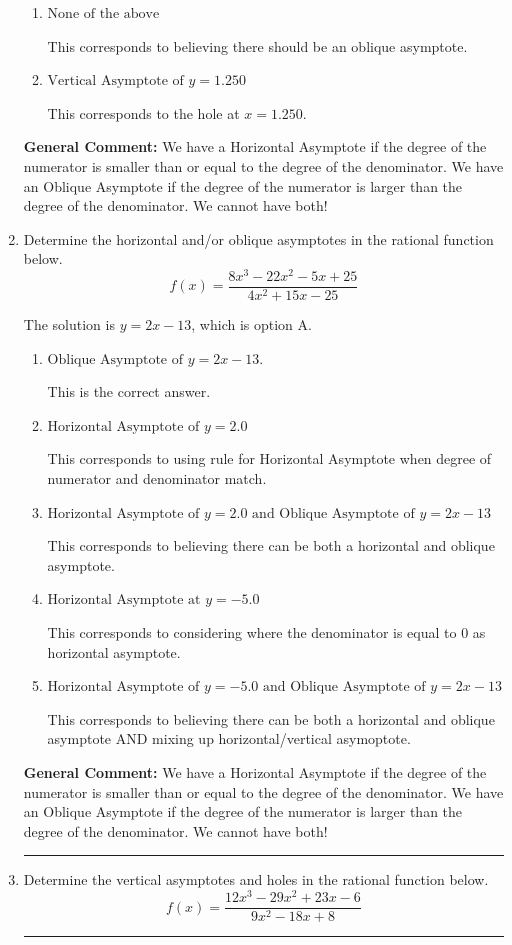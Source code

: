 \documentclass{extbook}[14pt]
\newcommand{\litem}[1]{\item #1

\rule{\textwidth}{0.4pt}}
\begin{document}
\begin{enumerate}
{\begin{enumerate}[label=\Alph*.]
This corresponds to using the rule for Horizontal Asymptote when the degree of the denominator is larger than the numerator.
\item \( \text{None of the above} \)

This corresponds to believing there should be an oblique asymptote.
\item \( \text{Vertical Asymptote of } y = 1.250  \)

This corresponds to the hole at $x = 1.250$.
\end{enumerate}

\textbf{General Comment:} We have a Horizontal Asymptote if the degree of the numerator is smaller than or equal to the degree of the denominator. We have an Oblique Asymptote if the degree of the numerator is larger than the degree of the denominator. We cannot have both!
}
\litem{
Determine the horizontal and/or oblique asymptotes in the rational function below.
\[ f(x) = \frac{8x^{3} -22 x^{2} -5 x + 25}{4x^{2} +15 x -25} \]

The solution is \( y = 2x -13 \), which is option A.\begin{enumerate}[label=\Alph*.]
\item \( \text{Oblique Asymptote of } y = 2x -13. \)

This is the correct answer.
\item \( \text{Horizontal Asymptote of } y = 2.0  \)

This corresponds to using rule for Horizontal Asymptote when degree of numerator and denominator match.
\item \( \text{Horizontal Asymptote of } y = 2.0 \text{ and Oblique Asymptote of } y = 2x -13 \)

This corresponds to believing there can be both a horizontal and oblique asymptote.
\item \( \text{Horizontal Asymptote at } y = -5.0 \)

This corresponds to considering where the denominator is equal to 0 as horizontal asymptote.
\item \( \text{Horizontal Asymptote of } y = -5.0 \text{ and Oblique Asymptote of } y = 2x -13 \)

This corresponds to believing there can be both a horizontal and oblique asymptote AND mixing up horizontal/vertical asymoptote.
\end{enumerate}

\textbf{General Comment:} We have a Horizontal Asymptote if the degree of the numerator is smaller than or equal to the degree of the denominator. We have an Oblique Asymptote if the degree of the numerator is larger than the degree of the denominator. We cannot have both!
}
\litem{
Determine the vertical asymptotes and holes in the rational function below.
\[ f(x) = \frac{12x^{3} -29 x^{2} +23 x -6}{9x^{2} -18 x + 8} \]

}
\end{enumerate}
\end{document}
